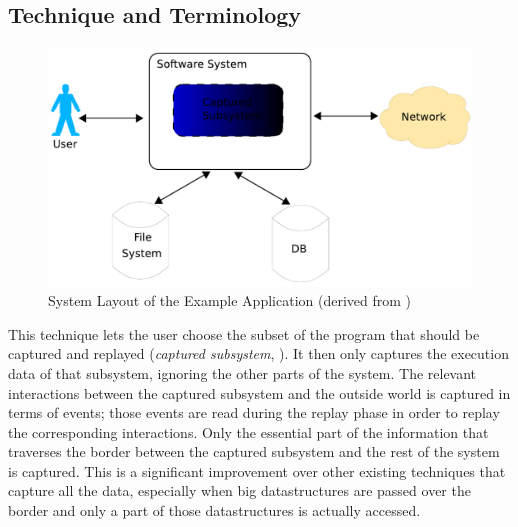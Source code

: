 \subsection{Technique and Terminology}
\begin{figure}[ht]
  \centering
  \includegraphics[width=1\textwidth]{illustrations/scr_overall_schema}
  \caption{System Layout of the Example Application (derived from \cite{orso05may})}
  \label{fig:scr_overall_schema}
\end{figure}
This technique lets the user choose the subset of the program that should be captured and replayed (\emph{captured subsystem}, ). It then only captures the execution data of that subsystem, ignoring the other parts of the system. The relevant interactions between the captured subsystem and the outside world is captured in terms of events; those events are read during the replay phase in order to replay the corresponding interactions. Only the essential part of the information that traverses the border between the captured subsystem and the rest of the system is captured. This is a significant improvement over other existing techniques that capture all the data, especially when big datastructures are passed over the border and only a part of those datastructures is actually accessed.

